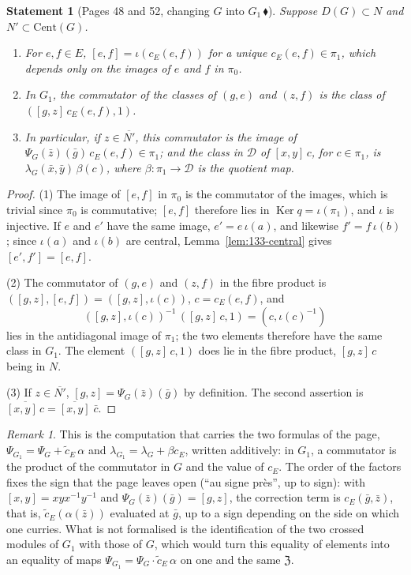 \documentclass[11pt]{article}
\newcommand{\q}[1]{“#1”}
\newcommand{\piste}[1]{\,\href{https://grothendieck.commutator.io/findings/\##1}{\textcolor{piste}{\ensuremath{\blacklozenge}}}}
\theoremstyle{plain}
\newtheorem*{enonce}{Statement}
\theoremstyle{definition}
\theoremstyle{remark}
\newtheorem*{remarque}{Remark}
\begin{document}
\begin{enonce}[Pages 48 and 52, changing $G$ into $G_1$\piste{133-centre-and-derived-group-from-two-crossed-modules}]
Suppose $D(G) \subset N$ and $N' \subset \mathrm{Cent}(G)$.
\begin{enumerate}
\item For $e, f \in E$, $[e, f] = \iota(c_E(e, f))$ for a unique $c_E(e, f) \in \pi_1$, which depends only on the images of $e$ and $f$ in $\pi_0$.
\item In $G_1$, the commutator of the classes of $(g, e)$ and $(z, f)$ is the class of $([g, z]\,c_E(e, f), 1)$.
\item In particular, if $z \in \overline{N'}$, this commutator is the image of $\Psi_G(\bar z)(\bar g)\,c_E(e, f) \in \pi_1$; and the class in $\mathcal D$ of $[x, y]\,c$, for $c \in \pi_1$, is $\lambda_G(\bar x, \bar y)\,\beta(c)$, where $\beta : \pi_1 \to \mathcal D$ is the quotient map.
\end{enumerate}
\end{enonce}

\begin{proof}
(1) The image of $[e, f]$ in $\pi_0$ is the commutator of the images, which is trivial since $\pi_0$ is commutative; $[e, f]$ therefore lies in $\operatorname{Ker} q = \iota(\pi_1)$, and $\iota$ is injective. If $e$ and $e'$ have the same image, $e' = e\,\iota(a)$, and likewise $f' = f\,\iota(b)$; since $\iota(a)$ and $\iota(b)$ are central, Lemma~\ref{lem:133-central} gives $[e', f'] = [e, f]$.

(2) The commutator of $(g, e)$ and $(z, f)$ in the fibre product is $([g, z], [e, f]) = ([g, z], \iota(c))$, $c = c_E(e, f)$, and
\[
([g, z], \iota(c))^{-1}\,([g, z]\,c, 1) = (c, \iota(c)^{-1})
\]
lies in the antidiagonal image of $\pi_1$; the two elements therefore have the same class in $G_1$. The element $([g, z]\,c, 1)$ does lie in the fibre product, $[g, z]\,c$ being in $N$.

(3) If $z \in \overline{N'}$, $[g, z] = \Psi_G(\bar z)(\bar g)$ by definition. The second assertion is $\overline{[x, y]\,c} = \overline{[x, y]}\;\bar c$.
\end{proof}

\begin{remarque}
This is the computation that carries the two formulas of the page, $\Psi_{G_1} = \Psi_G + \tilde c_E\,\alpha$ and $\lambda_{G_1} = \lambda_G + \beta c_E$, written additively: in $G_1$, a commutator is the product of the commutator in $G$ and the value of $c_E$. The order of the factors fixes the sign that the page leaves open (\q{au signe près}, up to sign): with $[x, y] = xyx^{-1}y^{-1}$ and $\Psi_G(\bar z)(\bar g) = [g, z]$, the correction term is $c_E(\bar g, \bar z)$, that is, $\tilde c_E(\alpha(\bar z))$ evaluated at $\bar g$, up to a sign depending on the side on which one curries. What is not formalised is the identification of the two crossed modules of $G_1$ with those of $G$, which would turn this equality of elements into an equality of maps $\Psi_{G_1} = \Psi_G \cdot \tilde c_E\,\alpha$ on one and the same $\mathfrak Z$.
\end{remarque}
\end{document}
